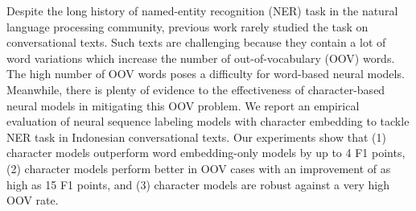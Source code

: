 Despite the long history of named-entity recognition (NER) task in the natural language processing community, previous work rarely studied the task on conversational texts. Such texts are challenging because they contain a lot of word variations which increase the number of out-of-vocabulary (OOV) words. The high number of OOV words poses a difficulty for word-based neural models. Meanwhile, there is plenty of evidence to the effectiveness of character-based neural models in mitigating this OOV problem. We report an empirical evaluation of neural sequence labeling models with character embedding to tackle NER task in Indonesian conversational texts. Our experiments show that (1) character models outperform word embedding-only models by up to 4 F1 points, (2) character models perform better in OOV cases with an improvement of as high as 15 F1 points, and (3) character models are robust against a very high OOV rate.
